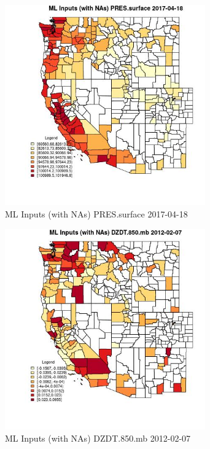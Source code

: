 \begin{figure} 
\centering  
\includegraphics[width=0.77\textwidth]{Code_Outputs/Report_ML_input_PM25_Step4_part_f_de_duplicated_aves_prioritize_24hr_obswNAs_CountyPRESsurfaceMean2017-04-18.jpg} 
\caption{\label{fig:Report_ML_input_PM25_Step4_part_f_de_duplicated_aves_prioritize_24hr_obswNAsCountyPRESsurfaceMean2017-04-18}ML Inputs (with NAs) PRES.surface 2017-04-18} 
\end{figure} 
 

\begin{figure} 
\centering  
\includegraphics[width=0.77\textwidth]{Code_Outputs/Report_ML_input_PM25_Step4_part_f_de_duplicated_aves_prioritize_24hr_obswNAs_CountyDZDT850mbMean2012-02-07.jpg} 
\caption{\label{fig:Report_ML_input_PM25_Step4_part_f_de_duplicated_aves_prioritize_24hr_obswNAsCountyDZDT850mbMean2012-02-07}ML Inputs (with NAs) DZDT.850.mb 2012-02-07} 
\end{figure} 
 

